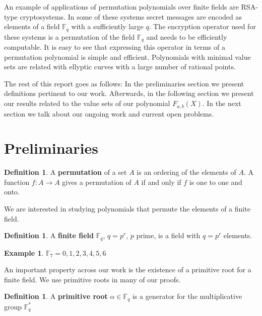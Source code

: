 \documentclass{article}
\theoremstyle{definition}
\newtheorem{definition}[theorem]{Definition}
\newtheorem{example}[theorem]{Example}
\theoremstyle{remark}
\numberwithin{equation}{section}
\begin{document}
An example of applications of permutation polynomials over finite fields are RSA-type cryptosystems. In some of these systems secret messages are encoded as elements of a field $\mathbb{F}_{q}$ with a sufficiently large $q$. The encryption operator used for these systems is a permutation of the field $\mathbb{F}_{q}$ and needs to be efficiently computable. It is easy to see that expressing this operator in terms of a permutation polynomial is simple and efficient. Polynomials with minimal value sets are related with ellyptic curves with a large number of rational points.

The rest of this report goes as follows: In the preliminaries section we present definitions pertinent to our work. Afterwards, in the following section we present our results related to the value sets of our polynomial $F_{a,b}(X)$. In the next section we talk about our ongoing work and current open problems.

\section{Preliminaries}

\begin{definition}
  A \textbf{permutation} of a set $A$ is an ordering of the elements of $A$. A function $f: A \rightarrow A$ gives a permutation of $A$ if and only if $f$ is one to one and onto.
\end{definition}

We are interested in studying polynomials that permute the elements of a finite field.

\begin{definition}
  A \textbf{finite field} $\mathbb{F}_{q}$, $q=p^r$, $p$ prime, is a field with $q=p^r$ elements.
\end{definition}

\begin{example}
    $\mathbb{F}_7 = {0,1,2,3,4,5,6}$
  \end{example}

An important property across our work is the existence of a primitive root for a finite field. We use primitive roots in many of our proofs.

\begin{definition}
  A \textbf{primitive root} $\alpha \in \mathbb{F}_q$ is a generator for the multiplicative group $\mathbb{F}_{q}^{*}$
\end{definition}
\end{document}
